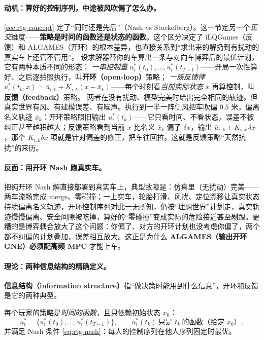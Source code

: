 \paragraph{动机：算好的控制序列，中途被风吹偏了怎么办。}
\cref{sec:rtg-concept} 定了“同时还是先后”（Nash vs Stackelberg）。这一节定另一个\emph{正交}维度——\textbf{策略是时间的函数还是状态的函数}。这个区分决定了 iLQGames（反馈）和 ALGAMES（开环）的根本差异，也直接关系到“求出来的解扔到有扰动的真实车上还管不管用”。
设求解器替你的车算出一条与对向车博弈后的最优计划，它有两种本质不同的形态：
\emph{一串控制量} $u_i^*(t_0),\dots,u_i^*(t_{T-1})$——开局一次性算好、之后逐拍照执行，叫\textbf{开环（open-loop）}策略；
\emph{一族反馈律} $u_i^*(t_k,x)=\bar u_{i,k}+K_{i,k}(x-\bar x_k)$——每个时刻看\emph{当前实际状态} $x$ 再算控制，叫\textbf{反馈（feedback）}策略。
两者在没有扰动、模型完美时给出完全相同的轨迹。但真实世界有风、有建模误差、有噪声。执行到一半一阵侧风把车吹偏 $0.5$ 米，偏离名义轨迹 $\bar x_k$：开环策略照旧输出 $u_i^*(t_k)$——它只看时间、不看状态，误差不被纠正甚至越积越大；反馈策略看到当前 $x$ 比名义 $\bar x_k$ 偏了 $\delta x$，输出 $\bar u_{i,k}+K_{i,k}\,\delta x$，那个 $K_{i,k}\delta x$ 项就是针对偏差的修正，把车往回拉。这就是反馈策略“天然抗扰”的来历。

\paragraph{反面：用开环 Nash 跑真实车。}
把纯开环 Nash 解直接部署到真实车上，典型故障是：仿真里（无扰动）完美——两车流畅完成 merge、零碰撞；一上实车，轮胎打滑、风扰、定位漂移让真实状态持续偏离名义轨迹，开环控制序列对此一无所知，仍按“理想世界”计划走，真实轨迹慢慢偏离、安全间隙被吃掉，算好的“零碰撞”变成实际的危险接近甚至剐蹭。更糟的是博弈耦合放大了这个问题：你偏了、对方的开环计划也没考虑你偏了，两个都不纠偏的计划叠加，误差相互放大。这正是为什么 \textbf{ALGAMES（输出开环 GNE）必须配高频 MPC} 才能上车。

\paragraph{理论：两种信息结构的精确定义。}
\textbf{信息结构（information structure）}指“做决策时能用到什么信息”，开环和反馈是它的两种典型\cite{basar1999dynamic}。

\begin{definition}\label{def:rtg-olne}
每个玩家的策略是\emph{时间的函数}，且只依赖初始状态 $x_0$：
\[
  u_i^*=\big\{u_i^*(t_0),\dots,u_i^*(t_{T-1})\big\},\qquad u_i^*(t_k)\ \text{只是 }t_k\ \text{的函数（给定 }x_0\text{）},
\]
并满足 Nash 条件 \cref{eq:rtg-nash}：每人的控制序列在他人序列固定时最优。
\end{definition}

